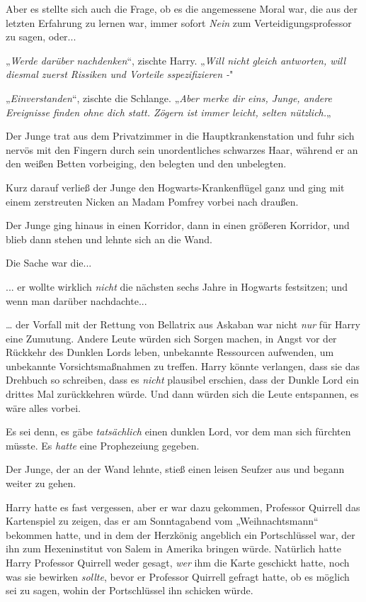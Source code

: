 {Aber es stellte sich auch die Frage, ob es die angemessene Moral war, die aus der letzten Erfahrung zu lernen war, immer sofort \emph{Nein} zum Verteidigungsprofessor zu sagen, oder...

„\emph{Werde darüber nachdenken}“, zischte Harry. „\emph{Will nicht gleich antworten, will diesmal zuerst Rissiken und Vorteile sspezifizieren -}"

„\emph{Einverstanden}“, zischte die Schlange. „\emph{Aber merke dir eins, Junge, andere Ereignisse finden ohne dich statt. Zögern ist immer leicht, selten nützlich.}„

Der Junge trat aus dem Privatzimmer in die Hauptkrankenstation und fuhr sich nervös mit den Fingern durch sein unordentliches schwarzes Haar, während er an den weißen Betten vorbeiging, den belegten und den unbelegten.

Kurz darauf verließ der Junge den Hogwarts-Krankenflügel ganz und ging mit einem zerstreuten Nicken an Madam Pomfrey vorbei nach draußen.

Der Junge ging hinaus in einen Korridor, dann in einen größeren Korridor, und blieb dann stehen und lehnte sich an die Wand.

Die Sache war die...

... er wollte wirklich \emph{nicht} die nächsten sechs Jahre in Hogwarts festsitzen; und wenn man darüber nachdachte...

… der Vorfall mit der Rettung von Bellatrix aus Askaban war nicht \emph{nur} für Harry eine Zumutung. Andere Leute würden sich Sorgen machen, in Angst vor der Rückkehr des Dunklen Lords leben, unbekannte Ressourcen aufwenden, um unbekannte Vorsichtsmaßnahmen zu treffen. Harry könnte verlangen, dass sie das Drehbuch so schreiben, dass es \emph{nicht} plausibel erschien, dass der Dunkle Lord ein drittes Mal zurückkehren würde. Und dann würden sich die Leute entspannen, es wäre alles vorbei.

Es sei denn, es gäbe \emph{tatsächlich} einen dunklen Lord, vor dem man sich fürchten müsste. Es \emph{hatte} eine Prophezeiung gegeben.

Der Junge, der an der Wand lehnte, stieß einen leisen Seufzer aus und begann weiter zu gehen.

Harry hatte es fast vergessen, aber er war dazu gekommen, Professor Quirrell das Kartenspiel zu zeigen, das er am Sonntagabend vom „Weihnachtsmann“ bekommen hatte, und in dem der Herzkönig angeblich ein Portschlüssel war, der ihn zum Hexeninstitut von Salem in Amerika bringen würde. Natürlich hatte Harry Professor Quirrell weder gesagt, \emph{wer} ihm die Karte geschickt hatte, noch was sie bewirken \emph{sollte}, bevor er Professor Quirrell gefragt hatte, ob es möglich sei zu sagen, wohin der Portschlüssel ihn schicken würde.

}
